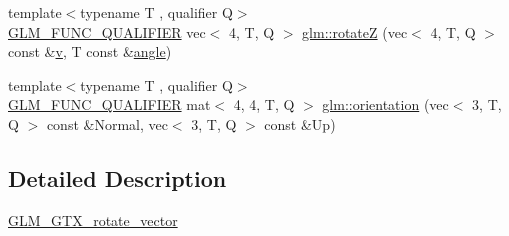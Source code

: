 \begin{DoxyCompactItemize}
\item 
{\footnotesize template$<$typename T , qualifier Q$>$ }\\\mbox{\hyperlink{setup_8hpp_a33fdea6f91c5f834105f7415e2a64407}{G\+L\+M\+\_\+\+F\+U\+N\+C\+\_\+\+Q\+U\+A\+L\+I\+F\+I\+ER}} vec$<$ 4, T, Q $>$ \mbox{\hyperlink{group__gtx__rotate__vector_ga923b75c6448161053768822d880702e6}{glm\+::rotateZ}} (vec$<$ 4, T, Q $>$ const \&\mbox{\hyperlink{_s_d_l__opengl_8h_a10a82eabcb59d2fcd74acee063775f90}{v}}, T const \&\mbox{\hyperlink{_s_d_l__opengl__glext_8h_a9e06c1f76a20fed54ca742cd25cb02c4}{angle}})
\item 
{\footnotesize template$<$typename T , qualifier Q$>$ }\\\mbox{\hyperlink{setup_8hpp_a33fdea6f91c5f834105f7415e2a64407}{G\+L\+M\+\_\+\+F\+U\+N\+C\+\_\+\+Q\+U\+A\+L\+I\+F\+I\+ER}} mat$<$ 4, 4, T, Q $>$ \mbox{\hyperlink{group__gtx__rotate__vector_ga1a32fceb71962e6160e8af295c91930a}{glm\+::orientation}} (vec$<$ 3, T, Q $>$ const \&Normal, vec$<$ 3, T, Q $>$ const \&Up)
\end{DoxyCompactItemize}


\subsection{Detailed Description}
\mbox{\hyperlink{group__gtx__rotate__vector}{G\+L\+M\+\_\+\+G\+T\+X\+\_\+rotate\+\_\+vector}} 